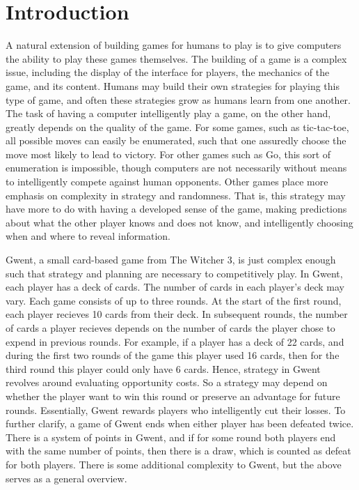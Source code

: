 \documentclass[numbers]{sigplanconf}
\begin{document}
\section{Introduction}
A natural extension of building games for humans to play is to give computers the ability to play these games themselves. The building of a game is a complex issue, including the display of the interface for players, the mechanics of the game, and its content. Humans may build their own strategies for playing this type of game, and often these strategies grow as humans learn from one another. The task of having a computer intelligently play a game, on the other hand, greatly depends on the quality of the game. For some games, such as tic-tac-toe, all possible moves can easily be enumerated, such that one assuredly choose the move most likely to lead to victory. For other games such as Go, this sort of enumeration is impossible, though computers are not necessarily without means to intelligently compete against human opponents. Other games place more emphasis on complexity in strategy and randomness. That is, this strategy may have more to do with having a developed sense of the game, making predictions about what the other player knows and does not know, and intelligently choosing when and where to reveal information. 

Gwent, a small card-based game from The Witcher 3, is just complex enough such that strategy and planning are necessary to competitively play. In Gwent, each player has a deck of cards. The number of cards in each player's deck may vary. Each game consists of up to three rounds. At the start of the first round, each player recieves 10 cards from their deck. In subsequent rounds, the number of cards a player recieves depends on the number of cards the player chose to expend in previous rounds. For example, if a player has a deck of 22 cards, and during the first two rounds of the game this player used 16 cards, then for the third round this player could only have 6 cards. Hence, strategy in Gwent revolves around evaluating opportunity costs. So a strategy may depend on whether the player want to win this round or preserve an advantage for future rounds. Essentially, Gwent rewards players who intelligently cut their losses. To further clarify, a game of Gwent ends when either player has been defeated twice. There is a system of points in Gwent, and if for some round both players end with the same number of points, then there is a draw, which is counted as defeat for both players. There is some additional complexity to Gwent, but the above serves as a general overview.
\end{document}
